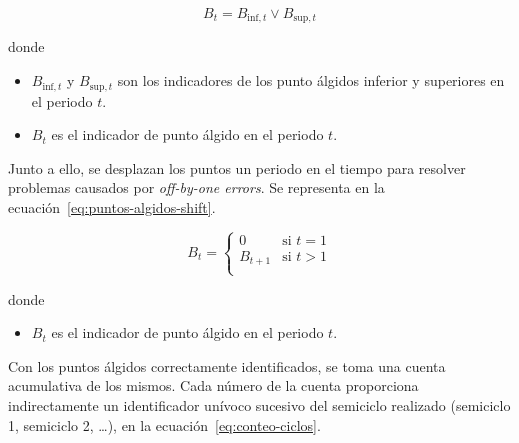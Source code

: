\begin{samepage}

  \begin{equation}
    \label{eq:puntos-algidos}
    B_{t} = B_{\text{inf}, t} \lor B_{\text{sup}, t}
  \end{equation}

  donde

  \begin{itemize}

    \item \( B_{\text{inf}, t} \) y \( B_{\text{sup}, t} \) son los indicadores de los punto álgidos inferior y superiores en el periodo \( t \).

    \item \( B_{t} \) es el indicador de punto álgido en el periodo \( t \).

  \end{itemize}

\end{samepage}

Junto a ello, se desplazan los puntos un periodo en el tiempo para resolver problemas causados por \textit{off-by-one errors}. Se representa en la ecuación~\ref{eq:puntos-algidos-shift}.

\begin{samepage}

  \begin{equation}
    \label{eq:puntos-algidos-shift}
    B_t =
    \begin{cases}
      0         & \text{si } t = 1 \\
      B_{t + 1} & \text{si } t > 1 \\
    \end{cases}
  \end{equation}

  donde

  \begin{itemize}

    \item \( B_{t} \) es el indicador de punto álgido en el periodo \( t \).

  \end{itemize}

\end{samepage}

Con los puntos álgidos correctamente identificados, se toma una cuenta acumulativa de los mismos. Cada número de la cuenta proporciona indirectamente un identificador unívoco sucesivo del semiciclo realizado (semiciclo 1, semiciclo 2, \ldots), en la ecuación~\ref{eq:conteo-ciclos}.

